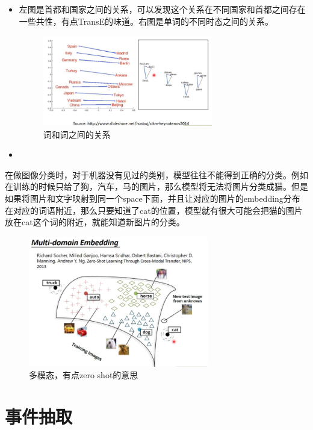\documentclass{article}
\begin{document}
\begin{itemize}
\item 左图是首都和国家之间的关系，可以发现这个关系在不同国家和首都之间存在一些共性，有点TransE的味道。右图是单词的不同时态之间的关系。
\begin{figure}[H]
    \centering
    \includegraphics[width=0.7\textwidth]{fig/TransE.png}
    \caption{词和词之间的关系}
\end{figure}

\item 
\end{itemize} 在做图像分类时，对于机器没有见过的类别，模型往往不能得到正确的分类。例如在训练的时候只给了狗，汽车，马的图片，那么模型将无法将图片分类成猫。但是如果将图片和文字映射到同一个space下面，并且让对应的图片的embedding分布在对应的词语附近，那么只要知道了cat的位置，模型就有很大可能会把猫的图片放在cat这个词的附近，就能知道新图片的分类。
\begin{figure}[H]
    \centering
    \includegraphics[width=0.7\textwidth]{fig/zero shot.png}
    \caption{多模态，有点zero shot的意思}
\end{figure}




\section{事件抽取}
\end{document}
